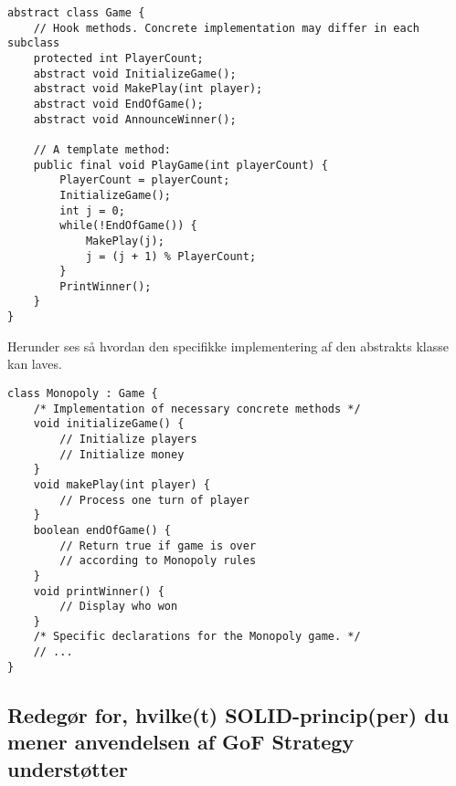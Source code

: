 \begin{lstlisting}
abstract class Game {
	// Hook methods. Concrete implementation may differ in each subclass
	protected int PlayerCount;
	abstract void InitializeGame();
	abstract void MakePlay(int player);
	abstract void EndOfGame();
	abstract void AnnounceWinner();
	
	// A template method:
	public final void PlayGame(int playerCount)	{
		PlayerCount = playerCount;
		InitializeGame();
		int j = 0;
		while(!EndOfGame()) {
			MakePlay(j);
			j = (j + 1) % PlayerCount;
		}
		PrintWinner();
	}
}
\end{lstlisting}

Herunder ses så hvordan den specifikke implementering af den abstrakts klasse kan laves.

\begin{lstlisting}
class Monopoly : Game {
	/* Implementation of necessary concrete methods */
	void initializeGame() {
		// Initialize players
		// Initialize money
	}
	void makePlay(int player) {
		// Process one turn of player
	}
	boolean endOfGame() {
		// Return true if game is over 
		// according to Monopoly rules
	}
	void printWinner() {
		// Display who won
	}
	/* Specific declarations for the Monopoly game. */
	// ...
}
\end{lstlisting}

\subsection{Redegør for, hvilke(t) SOLID-princip(per) du mener anvendelsen af GoF Strategy understøtter}








